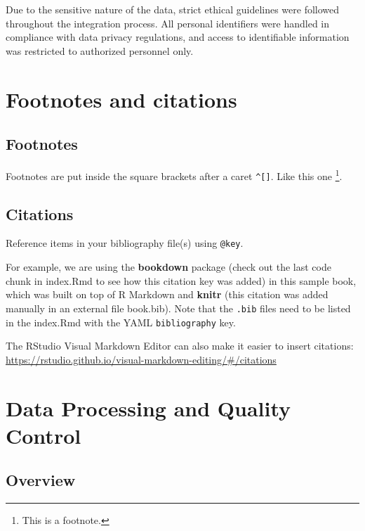 \documentclass[
]{book}
\begin{document}
Due to the sensitive nature of the data, strict ethical guidelines were followed throughout the integration process. All personal identifiers were handled in compliance with data privacy regulations, and access to identifiable information was restricted to authorized personnel only.

\hypertarget{footnotes-and-citations}{%
\chapter{Footnotes and citations}\label{footnotes-and-citations}}

\hypertarget{footnotes}{%
\section{Footnotes}\label{footnotes}}

Footnotes are put inside the square brackets after a caret \texttt{\^{}{[}{]}}. Like this one \footnote{This is a footnote.}.

\hypertarget{citations}{%
\section{Citations}\label{citations}}

Reference items in your bibliography file(s) using \texttt{@key}.

For example, we are using the \textbf{bookdown} package \citep{R-bookdown} (check out the last code chunk in index.Rmd to see how this citation key was added) in this sample book, which was built on top of R Markdown and \textbf{knitr} \citep{xie2015} (this citation was added manually in an external file book.bib).
Note that the \texttt{.bib} files need to be listed in the index.Rmd with the YAML \texttt{bibliography} key.

The RStudio Visual Markdown Editor can also make it easier to insert citations: \url{https://rstudio.github.io/visual-markdown-editing/\#/citations}

\hypertarget{data-processing-and-quality-control}{%
\chapter{Data Processing and Quality Control}\label{data-processing-and-quality-control}}

\hypertarget{overview-2}{%
\section{Overview}\label{overview-2}}
\end{document}

